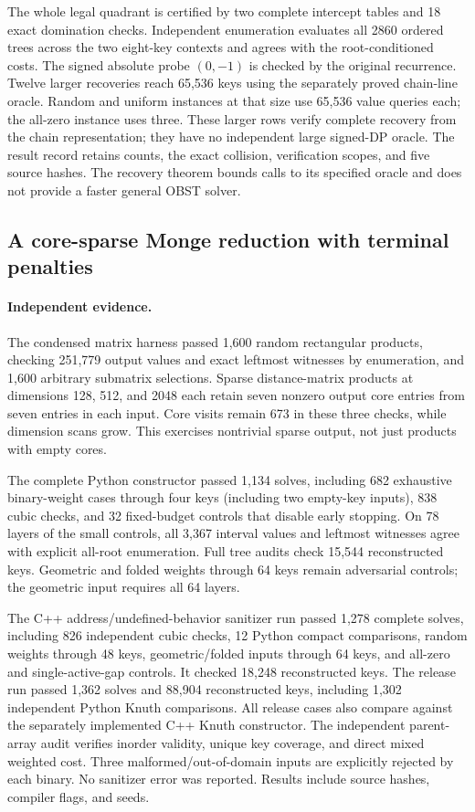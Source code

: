 \documentclass[11pt]{article}
\begin{document}
The whole legal quadrant is certified by two complete intercept tables and
18 exact domination checks. Independent enumeration evaluates all 2860
ordered trees across the two eight-key contexts and agrees with the
root-conditioned costs. The signed absolute probe $(0,-1)$ is checked by
the original recurrence. Twelve larger recoveries reach 65,536 keys using
the separately proved chain-line oracle. Random and uniform instances at
that size use 65,536 value queries each; the all-zero instance uses three.
These larger rows verify complete recovery from the chain representation;
they have no independent large signed-DP oracle. The result record retains
counts, the exact collision, verification scopes, and five source hashes.
The recovery theorem bounds calls to its specified oracle and does not
provide a faster general OBST solver.

\newpage

\subsection{A core-sparse Monge reduction with terminal penalties}
\paragraph{Independent evidence.}
The condensed matrix harness passed 1,600 random rectangular products,
checking 251,779 output values and exact leftmost witnesses by enumeration,
and 1,600 arbitrary submatrix selections. Sparse distance-matrix products
at dimensions 128, 512, and 2048 each retain seven nonzero output core
entries from seven entries in each input. Core visits remain 673 in these
three checks, while dimension scans grow. This exercises nontrivial sparse
output, not just products with empty cores.

The complete Python constructor passed 1,134 solves, including 682 exhaustive
binary-weight cases through four keys (including two empty-key inputs),
838 cubic checks, and 32 fixed-budget controls that disable early stopping.
On 78 layers of the small controls, all 3,367 interval values and leftmost
witnesses agree with explicit all-root enumeration. Full tree audits check
15,544 reconstructed keys. Geometric and folded weights through 64 keys
remain adversarial controls; the geometric input requires all 64 layers.

The C++ address/undefined-behavior sanitizer run passed 1,278 complete solves,
including 826 independent cubic checks, 12 Python compact comparisons,
random weights through 48 keys, geometric/folded inputs through 64 keys,
and all-zero and single-active-gap controls. It checked 18,248 reconstructed
keys. The release run passed 1,362 solves and 88,904 reconstructed keys,
including 1,302 independent Python Knuth comparisons. All release cases
also compare against the separately implemented C++ Knuth constructor.
The independent parent-array audit verifies inorder validity, unique key
coverage, and direct mixed weighted cost. Three malformed/out-of-domain
inputs are explicitly rejected by each binary. No sanitizer error was
reported. Results include source hashes, compiler flags, and seeds.
\end{document}
